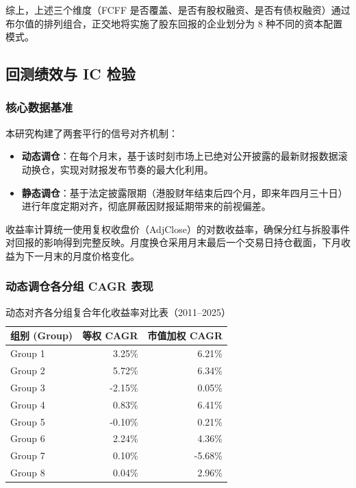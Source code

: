 \documentclass[a4paper,10pt]{article}
\begin{document}
综上，上述三个维度（FCFF 是否覆盖、是否有股权融资、是否有债权融资）通过布尔值的排列组合，正交地将实施了股东回报的企业划分为 8 种不同的资本配置模式。

\subsection{回测绩效与 IC 检验}

\subsubsection{核心数据基准}

本研究构建了两套平行的信号对齐机制：

\begin{itemize}
    \item \textbf{动态调仓}：在每个月末，基于该时刻市场上已绝对公开披露的最新财报数据滚动换仓，实现对财报发布节奏的最大化利用。
    \item \textbf{静态调仓}：基于法定披露限期（港股财年结束后四个月，即来年四月三十日）进行年度定期对齐，彻底屏蔽因财报延期带来的前视偏差。
\end{itemize}

收益率计算统一使用复权收盘价（AdjClose）的对数收益率，确保分红与拆股事件对回报的影响得到完整反映。月度换仓采用月末最后一个交易日持仓截面，下月收益为下一月末的月度价格变化。

\subsubsection{动态调仓各分组 CAGR 表现}

\begin{table}[H]
\centering
\caption{动态对齐各分组复合年化收益率对比表（2011--2025）}
\label{tab:dynamic_full}
\begin{tabular}{lrr}
\toprule
组别 (Group) & 等权 CAGR & 市值加权 CAGR \\
\midrule
Group 1 &  3.25\% &  6.21\% \\
Group 2 &  5.72\% &  6.34\% \\
Group 3 & -2.15\% &  0.05\% \\
Group 4 &  0.83\% &  6.41\% \\
Group 5 & -0.10\% &  0.21\% \\
Group 6 &  2.24\% &  4.36\% \\
Group 7 &  0.10\% & -5.68\% \\
Group 8 &  0.04\% &  2.96\% \\
\bottomrule
\end{tabular}
\end{table}
\end{document}
